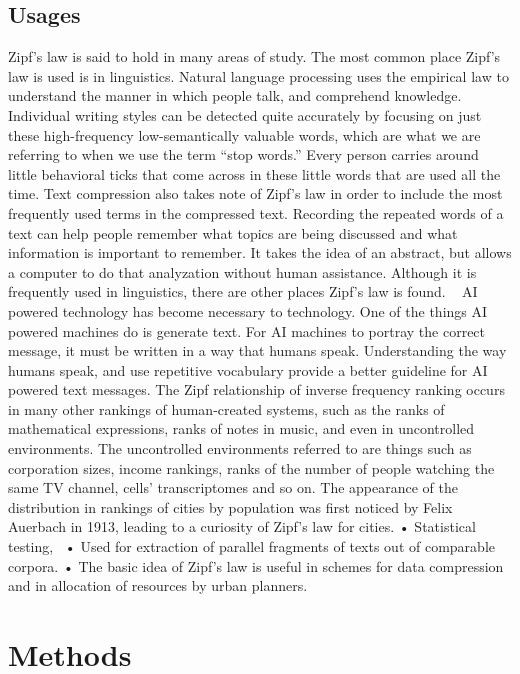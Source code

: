 \documentclass[a4paper,10pt]{article}
\begin{document}
	

\subsection{Usages}

Zipf's law is said to hold in many areas of study. The most common place Zipf's law is used is in linguistics. Natural language processing uses the empirical law to understand the manner in which people talk, and comprehend knowledge. Individual writing styles can be detected quite accurately by focusing on just these high-frequency low-semantically valuable words, which are what we are referring to when we use the term “stop words.”  Every person carries around little behavioral ticks that come across in these little words that are used all the time.  Text compression also takes note of Zipf's law in order to include the most frequently used terms in the compressed text. Recording the repeated words of a text can help people remember what topics are being discussed and what information is important to remember. It takes the idea of an abstract, but allows a computer to do that analyzation without human assistance. Although it is frequently used in linguistics, there are other places Zipf's law is found.  
AI powered technology has become necessary to technology. One of the things AI powered machines do is generate text. For AI machines to portray the correct message, it must be written in a way that humans speak. Understanding the way humans speak, and use repetitive vocabulary provide a better guideline for AI powered text messages. 
The Zipf relationship of inverse frequency ranking occurs in many other rankings of human-created systems, such as the ranks of mathematical expressions, ranks of notes in music, and even in uncontrolled environments. The uncontrolled environments referred to are things such as corporation sizes, income rankings, ranks of the number of people watching the same TV channel, cells' transcriptomes  and so on. The appearance of the distribution in rankings of cities by population was first noticed by Felix Auerbach in 1913, leading to a curiosity of Zipf's law for cities. 
• Statistical testing, 
• Used for extraction of parallel fragments of texts out of comparable corpora. 
• The basic idea of Zipf’s law is useful in schemes for data compression and in allocation of resources by urban planners.
	

\section{Methods}
\end{document}
